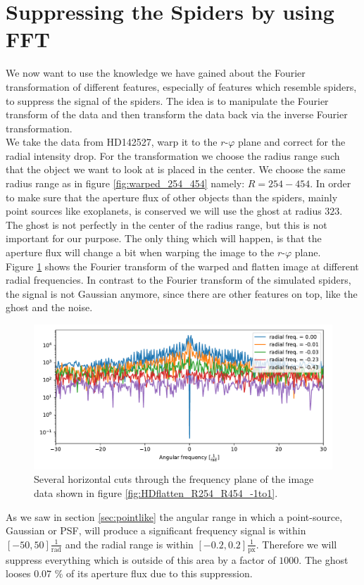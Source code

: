 \section{Suppressing the Spiders by using FFT}
We now want to use the knowledge we have gained about the Fourier transformation of different features, especially of features which resemble spiders, to suppress the signal of the spiders. The idea is to manipulate the Fourier transform of the data and then transform the data back via the inverse Fourier transformation.\\
We take the data from HD142527, warp it to the $r$-$\varphi$ plane and correct for the radial intensity drop. For the transformation we choose the radius range such that the object we want to look at is placed in the center. We choose the same radius range as in figure \ref{fig:warped_254_454} namely: $R=254-454$. In order to make sure that the aperture flux of other objects than the spiders, mainly point sources like exoplanets, is conserved we will use the ghost at radius $323$. The ghost is not perfectly in the center of the radius range, but this is not important for our purpose. The only thing which will happen, is that the aperture flux will change a bit when warping the image to the $r$-$\varphi$ plane.\\
Figure \ref{fig:rad0} shows the Fourier transform of the warped and flatten image at different radial frequencies. In contrast to the Fourier transform of the simulated spiders, the signal is not Gaussian anymore, since there are other features on top, like the ghost and the noise.
\begin{figure}[H]
	\centering
		\includegraphics[width=1.0\textwidth]{pics/rad0.pdf}
		\caption{Several horizontal cuts through the frequency plane of the image data shown in figure \ref{fig:HDflatten_R254_R454_-1to1}.}
		\label{fig:rad0}
\end{figure} 
As we saw in section \ref{sec:pointlike} the angular range in which a point-source, Gaussian or PSF, will produce a significant frequency signal is within $[-50, 50] \frac{1}{\mathrm{rad}}$ and the radial range is within $[-0.2, 0.2] \frac{1}{\mathrm{px}}$. Therefore we will suppress everything which is outside of this area by a factor of $1000$. The ghost looses $0.07$ \% of its aperture flux due to this suppression. \\
